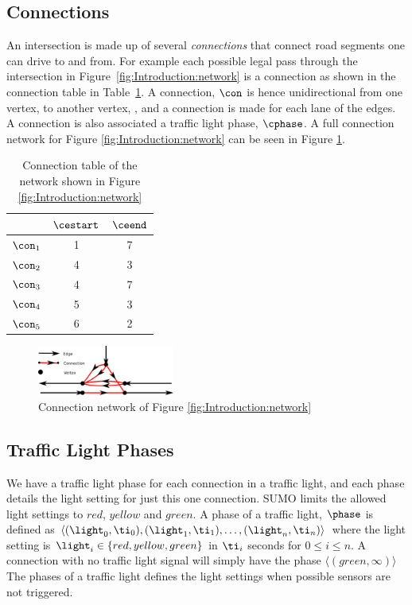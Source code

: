 \subsection{Connections}
An intersection is made up of several \textit{connections} that connect road segments one can drive to and from.
For example each possible legal pass through the intersection in Figure~\ref{fig:Introduction:network} is a connection as shown in the connection table in Table~\ref{tab:Introduction:connectionTable}. 
A connection, $\con$ is hence unidirectional from one vertex, \cestart to another vertex, \ceend, and a connection is made for each lane of the edges.
A connection is also associated a traffic light phase, $\cphase$. 
A full connection network for Figure \ref{fig:Introduction:network} can be seen in Figure \ref{fig:Model:Connection}.
\begin{table}[h]
\centering
\begin{tabular}{|l|c|c|}
\hline
&$\cestart$ & $\ceend$ \\ \hline
$\con_1$ & 1 & 7 \\ \hline
$\con_2$ & 4 & 3 \\ \hline
$\con_3$ & 4 & 7 \\ \hline
$\con_4$ & 5 & 3 \\ \hline
$\con_5$ & 6 & 2 \\ \hline
\end{tabular}
\caption{Connection table of the network shown in Figure \ref{fig:Introduction:network} }
\label{tab:Introduction:connectionTable}
\end{table}
\begin{figure}[h]
\centering
\includegraphics[width=0.4\textwidth]{images/ConnectionNetwork.png}
\caption{Connection network of Figure \ref{fig:Introduction:network}}
\label{fig:Model:Connection}
\end{figure}
\subsection{Traffic Light Phases}
We have a traffic light phase for each connection in a traffic light, and each phase details the light setting for just this one connection.
SUMO limits the allowed light settings to $red$, $yellow$ and $green$.
A phase of a traffic light, $\phase$ is defined as $\langle(\light_0, \ti_0),(\light_1, \ti_1),\dots, (\light_n, \ti_n) \rangle$ where the light setting is $\light_i\in \{red, yellow, green\}$ in $\ti_i$ seconds for $0 \leq i \leq n$.
A connection with no traffic light signal will simply have the phase $\langle(green, \infty)\rangle$
The phases of a traffic light defines the light settings when possible sensors are not triggered. %



